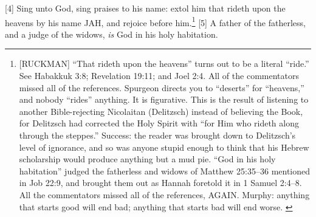 [4] \textcolor[rgb]{0.00,0.00,1.00}{Sing unto God, sing praises to his name: extol him that rideth upon the heavens by his name JAH, and rejoice before him.}\footnote{[RUCKMAN] “That rideth upon the heavens” turns out to be a literal “ride.” See Habakkuk 3:8; Revelation 19:11; and Joel 2:4. All of the commentators missed all of the references. Spurgeon directs you to “deserts” for “heavens,” and nobody “rides” anything. It is figurative. This is the result of listening to another Bible-rejecting Nicolaitan (Delitzsch) instead of believing the Book, for Delitzsch had corrected the Holy Spirit with “for Him who rideth along through the steppes.” Success: the reader was brought down to Delitzsch’s level of ignorance, and so was anyone stupid enough to think that his Hebrew scholarship would produce anything but a mud pie. “God in his holy habitation” judged the fatherless and widows of Matthew 25:35–36 mentioned in Job 22:9, and brought them out as Hannah foretold it in 1 Samuel 2:4–8. All the commentators missed all of the references, AGAIN. Murphy: anything that starts good will end bad; anything that starts bad will end worse. \cite{Ruckman1992Psalms}  }
[5] \textcolor[rgb]{0.00,0.00,1.00}{A father of the fatherless, and a judge of the widows, \emph{is} God in his holy habitation.}
